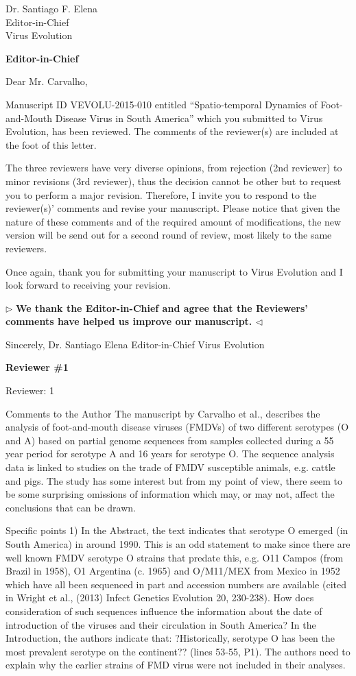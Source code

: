 \documentclass[ucla,biomath,12pt,noaddrfooter,datefrom]{UC_letter}
\newenvironment{reply}{$\triangleright$\bf}{$\triangleleft$}
\begin{document}
\begin{letter}{
Dr. Santiago F. Elena \\
Editor-in-Chief \\
Virus Evolution
}
\clearpage

\textbf{Editor-in-Chief}

Dear Mr. Carvalho,

Manuscript ID VEVOLU-2015-010 entitled ``Spatio-temporal Dynamics of Foot-and-Mouth Disease Virus in South America'' which you submitted to Virus Evolution, has been reviewed.  
The comments of the reviewer(s) are included at the foot of this letter.

The three reviewers have very diverse opinions, from rejection (2nd reviewer) to minor revisions (3rd reviewer), thus the decision cannot be other but to request you to perform a major revision.  
Therefore, I invite you to respond to the reviewer(s)' comments and revise your manuscript.  
Please notice that given the nature of these comments and of the required amount of modifications, the new version will be send out for a second round of review, most likely to the same reviewers.

Once again, thank you for submitting your manuscript to Virus Evolution and I look forward to receiving your revision.

\begin{reply}
We thank the Editor-in-Chief and agree that the Reviewers' comments have helped us improve our manuscript. 
\end{reply}

Sincerely,
Dr. Santiago Elena
Editor-in-Chief
Virus Evolution



\textbf{Reviewer \#1}

Reviewer: 1

Comments to the Author
The manuscript by Carvalho et al., describes the analysis of foot-and-mouth disease viruses (FMDVs) of two different serotypes (O and A) based on partial genome sequences from samples collected during a 55 year period for serotype A and 16 years for serotype O. 
The sequence analysis data is linked to studies on the trade of FMDV susceptible animals, e.g. cattle and pigs. 
The study has some interest but from my point of view, there seem to be some surprising omissions of information which may, or may not, affect the conclusions that can be drawn.

Specific points
1)      In the Abstract, the text indicates that serotype O emerged (in South America) in around 1990. 
This is an odd statement to make since there are well known FMDV serotype O strains that predate this, e.g. O11 Campos (from Brazil in 1958), O1 Argentina (c. 1965) and O/M11/MEX from Mexico in 1952 which have all been sequenced in part and accession numbers are available (cited in Wright et al., (2013) Infect Genetics Evolution 20, 230-238).  
How does consideration of such sequences influence the information about the date of introduction of the viruses and their circulation in South America? 
In the Introduction, the authors indicate that: ?Historically, serotype O has been the most prevalent serotype on the continent?? (lines 53-55, P1). 
The authors need to explain why the earlier strains of FMD virus were not included in their analyses.


\end{letter}
\end{document}
